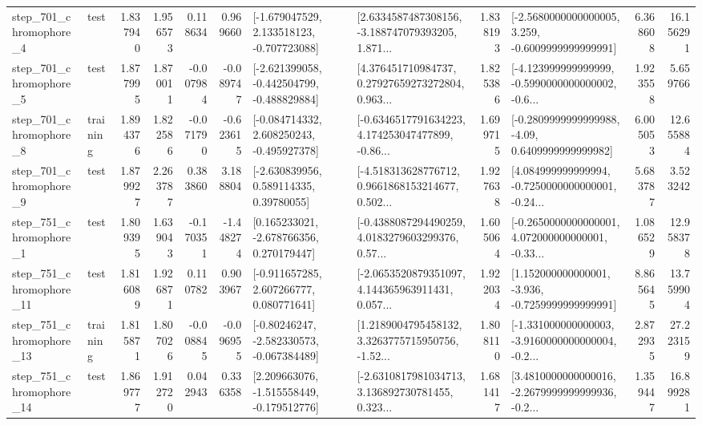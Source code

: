 \begin{tabular}{llrrrrllrlrr}
   step\_701\_chromophore\_4 &      test &      1.837940 &    1.956573 &      0.118634 &  0.969660 &   [-1.679047529, 2.133518123, -0.707723088] &  [2.6334587487308156, -3.188747079393205, 1.871... &       1.838193 &  [-2.5680000000000005, 3.259, -0.6009999999999991] &            6.368608 &         16.156291 \\
   step\_701\_chromophore\_5 &      test &      1.877995 &    1.870011 &     -0.007984 & -0.089747 &  [-2.621399058, -0.442504799, -0.488829884] &  [4.376451710984737, 0.27927659273272804, 0.963... &       1.825386 &  [-4.123999999999999, -0.5990000000000002, -0.6... &            1.923558 &          5.659766 \\
   step\_701\_chromophore\_8 &  training &      1.894376 &    1.822586 &     -0.071790 & -0.623615 &   [-0.084714332, 2.608250243, -0.495927378] &  [-0.6346517791634223, 4.174253047477899, -0.86... &       1.699715 &   [-0.2809999999999988, -4.09, 0.6409999999999982] &            6.005053 &         12.655884 \\
   step\_701\_chromophore\_9 &      test &      1.879927 &    2.263787 &      0.383860 &  3.188804 &     [-2.630839956, 0.589114335, 0.39780055] &  [-4.518313628776712, 0.9661868153214677, 0.502... &       1.927638 &  [4.084999999999994, -0.7250000000000001, -0.24... &            5.683787 &          3.523242 \\
   step\_751\_chromophore\_1 &      test &      1.809395 &    1.639043 &     -0.170351 & -1.448274 &    [0.165233021, -2.678766356, 0.270179447] &  [-0.4388087294490259, 4.0183279603299376, 0.57... &       1.605064 &  [-0.2650000000000001, 4.072000000000001, -0.33... &            1.086529 &         12.958378 \\
  step\_751\_chromophore\_11 &      test &      1.816089 &    1.926871 &      0.110782 &  0.903967 &    [-0.911657285, 2.607266777, 0.080771641] &  [-2.0653520879351097, 4.144365963911431, 0.057... &       1.922034 &   [1.152000000000001, -3.936, -0.7259999999999991] &            8.865645 &         13.759904 \\
  step\_751\_chromophore\_13 &  training &      1.815871 &    1.807026 &     -0.008845 & -0.096955 &   [-0.80246247, -2.582330573, -0.067384489] &  [1.2189004795458132, 3.3263775715950756, -1.52... &       1.808110 &  [-1.331000000000003, -3.9160000000000004, -0.2... &            2.872935 &         27.223159 \\
  step\_751\_chromophore\_14 &      test &      1.869777 &    1.912720 &      0.042943 &  0.336358 &   [2.209663076, -1.515558449, -0.179512776] &  [-2.6310817981034713, 3.136892730781455, 0.323... &       1.681417 &  [3.4810000000000016, -2.2679999999999936, -0.2... &            1.359447 &         16.899281 \\

\end{tabular}
